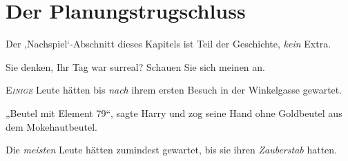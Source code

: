 \chapter{Der Planungstrugschluss}

\begin{chapterOpeningAuthorNote}
%
Der ‚Nachspiel‘-Abschnitt dieses Kapitels ist Teil der Geschichte, \emph{kein} Extra.
\end{chapterOpeningAuthorNote}
\begin{chapterOpeningQuote}
Sie denken, Ihr Tag war surreal? Schauen Sie sich meinen an.
\end{chapterOpeningQuote}

\lettrine{E}{\emph{inige}} Leute hätten bis \emph{nach} ihrem ersten Besuch in der Winkelgasse gewartet.

„Beutel mit Element 79“, sagte Harry und zog seine Hand ohne Goldbeutel aus dem Mokehautbeutel.

Die \emph{meisten} Leute hätten zumindest gewartet, bis sie ihren \emph{Zauberstab} hatten.

